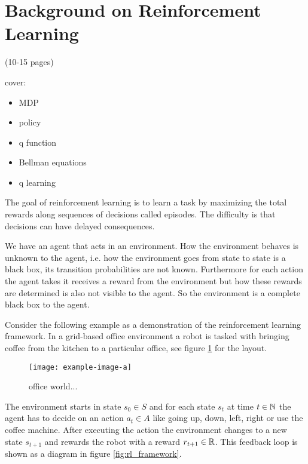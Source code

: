 \section{Background on Reinforcement Learning}

\begin{notes}
    (10-15 pages)

    cover:
    \begin{itemize}
        \item MDP
        \item policy
        \item q function
        \item Bellman equations
        \item q learning
    \end{itemize}
\end{notes}

The goal of reinforcement learning is to learn a task by maximizing the total rewards along sequences of decisions called episodes. The difficulty is that decisions can have delayed consequences.

We have an agent that acts in an environment. How the environment behaves is unknown to the agent, i.e. how the environment goes from state to state is a black box, its transition probabilities are not known. Furthermore for each action the agent takes it receives a reward from the environment but how these rewards are determined is also not visible to the agent. So the environment is a complete black box to the agent.

Consider the following example as a demonstration of the reinforcement learning framework. In a grid-based office environment a robot is tasked with bringing coffee from the kitchen to a particular office, see figure \ref{fig:officegrid} for the layout.

\begin{figure}[h]
    \centering
    \texttt{[image: example-image-a]}
    \caption{office world...}
    \label{fig:officegrid}
\end{figure}

The environment starts in state $s_0 \in S$ and for each state $s_t$ at time $t \in \mathbb{N}$ the agent has to decide on an action $a_t \in A$ like going up, down, left, right or use the coffee machine. After executing the action the environment changes to a new state $s_{t+1}$ and rewards the robot with a reward $r_{t+1} \in \mathbb{R}$. This feedback loop is shown as a diagram in figure \ref{fig:rl_framework}.

